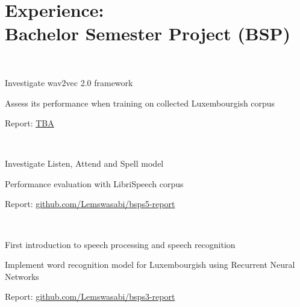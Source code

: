 \documentclass[]{curriculumvitae}
\begin{document}
\begin{minipage}[t]{0.65\textwidth} 

\section{Experience:\\ Bachelor Semester Project (BSP)}

\\
\vspace{0.9em} 
\begin{tightemize}
	\item Investigate wav2vec 2.0 framework
	\item Assess its performance when training on collected Luxembourgish corpus
	\item \faPaper \hspace{0.2em} Report: \href{https://github.com/Lemswasabi}{TBA}
\end{tightemize}
\sectionsep

\\
\vspace{0.9em}
\begin{tightemize}
	\item Investigate Listen, Attend and Spell model
	\item Performance evaluation with LibriSpeech corpus
	\item \faPaper \hspace{0.2em} Report: \href{https://github.com/Lemswasabi/bsps5-report}{github.com/Lemswasabi/bsps5-report}
\end{tightemize}
\sectionsep

\\
\vspace{0.9em}
\begin{tightemize}
	\item First introduction to speech processing and speech recognition
	\item Implement word recognition model for Luxembourgish using Recurrent Neural Networks
	\item \faPaper \hspace{0.2em} Report: \href{https://github.com/Lemswasabi/bsps3-report}{github.com/Lemswasabi/bsps3-report}
\end{tightemize}
\sectionsep


\end{minipage}
\end{document}
